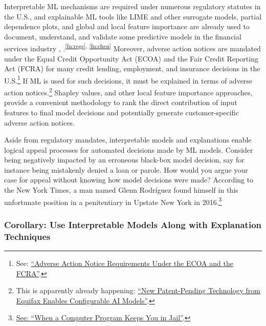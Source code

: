 \documentclass{article}
\begin{document}
Interpretable ML mechanisms are required under numerous regulatory statutes in the U.S., and explainable ML tools like LIME and other surrogate models, partial dependence plots, and global and local feature importance are already used to document, understand, and validate some predictive models in the financial services industry \cite{lime-sup}, \cite{wf_xnn}.\textsuperscript{\ref{fn:regs}, \ref{fn:chen}} Moreover, adverse action notices are mandated under the Equal Credit Opportunity Act (ECOA) and the Fair Credit Reporting Act (FCRA) for many credit lending, employment, and insurance decisions in the U.S.\footnote{\scriptsize{See: \href{https://consumercomplianceoutlook.org/2013/second-quarter/adverse-action-notice-requirements-under-ecoa-fcra/}{``Adverse Action Notice Requirements Under the ECOA and the FCRA''}.}} If ML is used for such decisions, it must be explained in terms of adverse action notices.\footnote{\scriptsize{This is apparently already happening: \href{https://www.prnewswire.com/news-releases/new-patent-pending-technology-from-equifax-enables-configurable-ai-models-300701153.html}{``New Patent-Pending Technology from Equifax Enables Configurable AI Models''}.}} Shapley values, and other local feature importance approaches, provide a convenient methodology to rank the direct contribution of input features to final model decisions and potentially generate customer-specific adverse action notices.

Aside from regulatory mandates, interpretable models and explanations enable logical appeal processes for automated decisions made by ML models. Consider being negatively impacted by an erroneous black-box model decision, say for instance being mistakenly denied a loan or parole. How would you argue your case for appeal without knowing how model decisions were made? According to the New York Times, a man named Glenn Rodr\'iguez found himself in this unfortunate position in a penitentiary in Upstate New York in 2016.\footnote{\scriptsize{\href{https://www.nytimes.com/2017/06/13/opinion/how-computers-are-harming-criminal-justice.html}{See: ``When a Computer Program Keeps You in Jail''}.}}

\subsubsection{Corollary: Use Interpretable Models Along with Explanation Techniques} \label{cor:int_ex}
\end{document}
